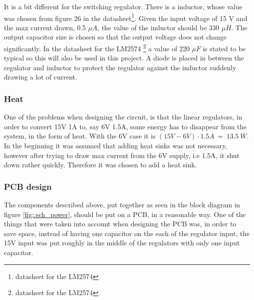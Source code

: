 It is a bit different for the switching regulator. There is a inductor, whose value was chosen from figure 26 in the datasheet\footnote{datasheet for the LM2574}. Given the input voltage of 15 V and the max current drawn, 0.5 $\mu A$, the value of the inductor should be 330 $\mu H$. The output capacitor size is chosen so that the output voltage does not change significantly. In the datasheet for the LM2574 \footnote{datasheet for the LM2574} a value of 220 $\mu F$ is stated to be typical so this will also be used in this project. A diode is placed in between the regulator and inductor to protect the regulator against the inductor suddenly drawing a lot of current.

\subsubsection{Heat}
One of the problems when designing the circuit, is that the linear regulators, in order to convert 15V 1A to, say 6V 1.5A, some energy has to disappear from the system, in the form of heat. With the 6V case it is $(15V - 6V)\cdot 1.5A\ =\ 13.5\ W$. In the beginning it was assumed that adding heat sinks was not necessary, however after trying to draw max current from the 6V supply, i.e 1.5A, it shut down rather quickly. Therefore it was chosen to add a heat sink. 

\subsubsection{PCB design}
The components described above, put together as seen in the block diagram in figure \ref{fig::sch_power}, should be put on a PCB, in a reasonable way. One of the things that were taken into account when designing the PCB was, in order to save space, instead of having one capacitor on the each of the regulator input, the 15V input was put roughly in the middle of the regulators with only one input capacitor. 

